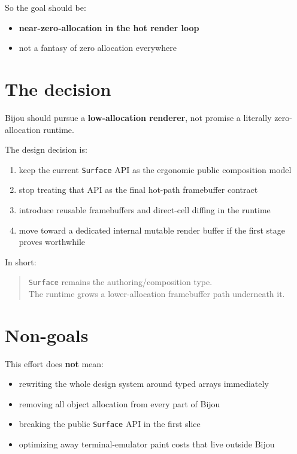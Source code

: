 So the goal should be:

\begin{itemize}
\tightlist
\item
  \textbf{near-zero-allocation in the hot render loop}
\item
  not a fantasy of zero allocation everywhere
\end{itemize}

\section{The decision}\label{record-052-the-decision}

Bijou should pursue a \textbf{low-allocation renderer}, not promise a literally zero-allocation runtime.

The design decision is:

\begin{enumerate}
\def\labelenumi{\arabic{enumi}.}
\tightlist
\item
  keep the current \texttt{S\allowbreak{}u\allowbreak{}r\allowbreak{}f\allowbreak{}a\allowbreak{}c\allowbreak{}e} API as the ergonomic public composition model
\item
  stop treating that API as the final hot-path framebuffer contract
\item
  introduce reusable framebuffers and direct-cell diffing in the runtime
\item
  move toward a dedicated internal mutable render buffer if the first stage proves worthwhile
\end{enumerate}

In short:

\begin{quote}
\texttt{S\allowbreak{}u\allowbreak{}r\allowbreak{}f\allowbreak{}a\allowbreak{}c\allowbreak{}e} remains the authoring/composition type.\\
The runtime grows a lower-allocation framebuffer path underneath it.
\end{quote}

\section{Non-goals}\label{record-052-non-goals}

This effort does \textbf{not} mean:

\begin{itemize}
\tightlist
\item
  rewriting the whole design system around typed arrays immediately
\item
  removing all object allocation from every part of Bijou
\item
  breaking the public \texttt{S\allowbreak{}u\allowbreak{}r\allowbreak{}f\allowbreak{}a\allowbreak{}c\allowbreak{}e} API in the first slice
\item
  optimizing away terminal-emulator paint costs that live outside Bijou
\end{itemize}

